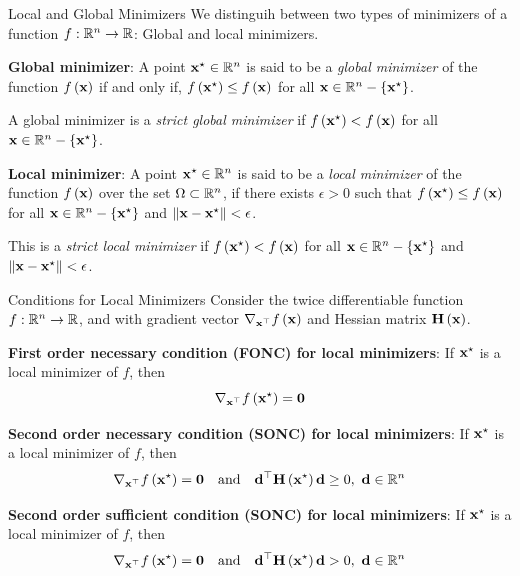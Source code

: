 \documentclass[aspectratio=169]{beamer}
\def\mf{\ensuremath\mathbf}
\def\mb{\ensuremath\mathbb}
\def\lp{\ensuremath\left(}
\def\rp{\ensuremath\right)}
\def\lc{\ensuremath\left\{}
\def\rc{\ensuremath\right\}}
\def\R{\ensuremath\mb{R}}
\newcommand{\ct}[1]{\lp #1\rp}
\begin{document}
\begin{frame}{Local and Global Minimizers}
  We distinguih between two types of minimizers of a function $f :\R^n \to \R$:  Global and local minimizers.
  \vspace{0.25cm}

  \textbf{Global minimizer}: A point $\mf{x}^{\star} \in \R^n$ is said to be a \textit{global minimizer} of the function $f\ct{\mf{x}}$ if and only if, $f\ct{\mf{x}^{\star}} \leq f\ct{\mf{x}}$ for all $\mf{x} \in \R^n - \lc \mf{x}^{\star} \rc$. 
  \vspace{0.25cm}
  
  A global minimizer is a \textit{strict global minimizer} if $f\ct{\mf{x}^{\star}} < f\ct{\mf{x}}$ for all $\mf{x} \in \R^n - \lc \mf{x}^{\star} \rc$.
  \vspace{0.25cm}
  
  \textbf{Local minimizer}: A point $\mf{x}^{\star} \in \R^n$ is said to be a \textit{local minimizer} of the function $f\ct{\mf{x}}$ over the set $\Omega \subset \R^n$, if there exists $\epsilon > 0$ such that $f\ct{\mf{x}^{\star}} \leq f\ct{\mf{x}}$ for all $\mf{x} \in \R^n - \lc \mf{x}^{\star} \rc$ and $\Vert \mf{x} - \mf{x}^{\star}\Vert < \epsilon$. 
  \vspace{0.25cm}

  This is a \textit{strict local minimizer} if $f\ct{\mf{x}^{\star}} < f\ct{\mf{x}}$ for all $\mf{x} \in \R^n - \lc \mf{x}^{\star} \rc$ and $\Vert \mf{x} - \mf{x}^{\star}\Vert < \epsilon$.
\end{frame}


\begin{frame}{Conditions for Local Minimizers}
  Consider the twice differentiable function $f: \R^n \to \R$, and with gradient vector $\nabla_{\mf{x}^\top}f\ct{\mf{x}}$ and Hessian matrix $\mf{H}\ct{\mf{x}}$.
  \vspace{0.1cm}

  \textbf{First order necessary condition (FONC) for local minimizers}:
  If $\mf{x}^{\star}$ is a local minimizer of $f$, then
  \[ \nabla_{\mf{x}^\top}f\ct{\mf{x^{\star}}} = \mf{0} \]

  \textbf{Second order necessary condition (SONC) for local minimizers}:
  If $\mf{x}^{\star}$ is a local minimizer of $f$, then
  \[ \nabla_{\mf{x}^\top}f\ct{\mf{x^{\star}}} = \mf{0} \quad \text{and} \quad \mf{d}^\top\mf{H}\ct{\mf{x}^{\star}}
  \mf{d} \geq 0, \,\, \mf{d} \in \R^n \]

  \textbf{Second order sufficient condition (SONC) for local minimizers}:
  If $\mf{x}^{\star}$ is a local minimizer of $f$, then
  \[ \nabla_{\mf{x}^\top}f\ct{\mf{x^{\star}}} = \mf{0} \quad \text{and} \quad \mf{d}^\top\mf{H}\ct{\mf{x}^{\star}}
  \mf{d} > 0, \,\, \mf{d} \in \R^n \]
\end{frame}
\end{document}
